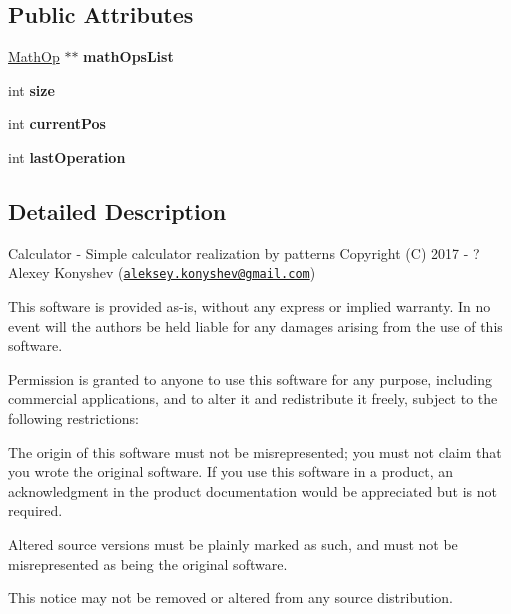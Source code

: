 \subsection*{Public Attributes}
\begin{DoxyCompactItemize}
\item 
\hypertarget{class_math_op_list_a4ac4dea48bead1d889e92b41c3d99c49}{}\hyperlink{class_math_op}{Math\+Op} $\ast$$\ast$ {\bfseries math\+Ops\+List}\label{class_math_op_list_a4ac4dea48bead1d889e92b41c3d99c49}

\item 
\hypertarget{class_math_op_list_afe8625a3d84f8654d9f0a7a91fd6f72f}{}int {\bfseries size}\label{class_math_op_list_afe8625a3d84f8654d9f0a7a91fd6f72f}

\item 
\hypertarget{class_math_op_list_a3ea410994e07a06ce9d177c639b514a2}{}int {\bfseries current\+Pos}\label{class_math_op_list_a3ea410994e07a06ce9d177c639b514a2}

\item 
\hypertarget{class_math_op_list_a7ee46ef2288f804bc6f6241e42e97093}{}int {\bfseries last\+Operation}\label{class_math_op_list_a7ee46ef2288f804bc6f6241e42e97093}

\end{DoxyCompactItemize}


\subsection{Detailed Description}
Calculator -\/ Simple calculator realization by patterns Copyright (C) 2017 -\/ ? Alexey Konyshev (\href{mailto:aleksey.konyshev@gmail.com}{\tt aleksey.\+konyshev@gmail.\+com})

This software is provided \textquotesingle{}as-\/is\textquotesingle{}, without any express or implied warranty. In no event will the authors be held liable for any damages arising from the use of this software.

Permission is granted to anyone to use this software for any purpose, including commercial applications, and to alter it and redistribute it freely, subject to the following restrictions\+:


\begin{DoxyEnumerate}
\item The origin of this software must not be misrepresented; you must not claim that you wrote the original software. If you use this software in a product, an acknowledgment in the product documentation would be appreciated but is not required.
\item Altered source versions must be plainly marked as such, and must not be misrepresented as being the original software.
\item This notice may not be removed or altered from any source distribution. 
\end{DoxyEnumerate}

